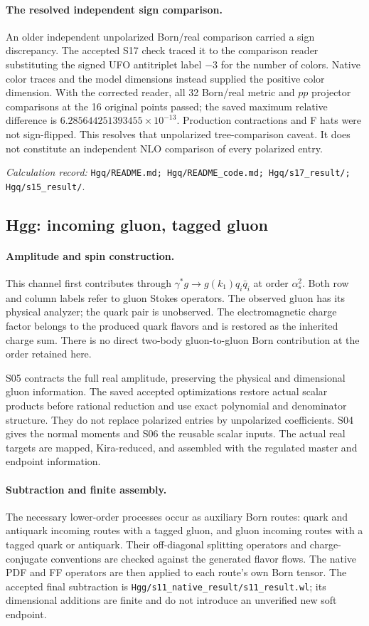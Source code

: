 \documentclass[11pt,a4paper]{article}
\newcommand{\as}{\alpha_s}
\newcommand{\code}[1]{{\small\nolinkurl{#1}}}
\newcommand{\pathref}[1]{\par{\footnotesize\textit{Calculation record:} \code{#1}.}\par}
\begin{document}
\paragraph{The resolved independent sign comparison.}
An older independent unpolarized Born/real comparison carried a sign discrepancy. The accepted S17 check traced it to the comparison reader substituting the signed UFO antitriplet label $-3$ for the number of colors. Native color traces and the model dimensions instead supplied the positive color dimension. With the corrected reader, all 32 Born/real metric and $pp$ projector comparisons at the 16 original points passed; the saved maximum relative difference is $6.285644251393455\times10^{-13}$. Production contractions and F hats were not sign-flipped. This resolves that unpolarized tree-comparison caveat. It does not constitute an independent NLO comparison of every polarized entry.
\pathref{Hgq/README.md; Hgq/README_code.md; Hgq/s17_result/; Hgq/s15_result/}

\subsection{Hgg: incoming gluon, tagged gluon}
\paragraph{Amplitude and spin construction.}
This channel first contributes through $\gamma^*g\to g(k_1)q_i\bar q_i$ at order $\as^2$. Both row and column labels refer to gluon Stokes operators. The observed gluon has its physical analyzer; the quark pair is unobserved. The electromagnetic charge factor belongs to the produced quark flavors and is restored as the inherited charge sum. There is no direct two-body gluon-to-gluon Born contribution at the order retained here.

S05 contracts the full real amplitude, preserving the physical and dimensional gluon information. The saved accepted optimizations restore actual scalar products before rational reduction and use exact polynomial and denominator structure. They do not replace polarized entries by unpolarized coefficients. S04 gives the normal moments and S06 the reusable scalar inputs. The actual real targets are mapped, Kira-reduced, and assembled with the regulated master and endpoint information.

\paragraph{Subtraction and finite assembly.}
The necessary lower-order processes occur as auxiliary Born routes: quark and antiquark incoming routes with a tagged gluon, and gluon incoming routes with a tagged quark or antiquark. Their off-diagonal splitting operators and charge-conjugate conventions are checked against the generated flavor flows. The native PDF and FF operators are then applied to each route's own Born tensor. The accepted final subtraction is \code{Hgg/s11_native_result/s11_result.wl}; its dimensional additions are finite and do not introduce an unverified new soft endpoint.
\end{document}

